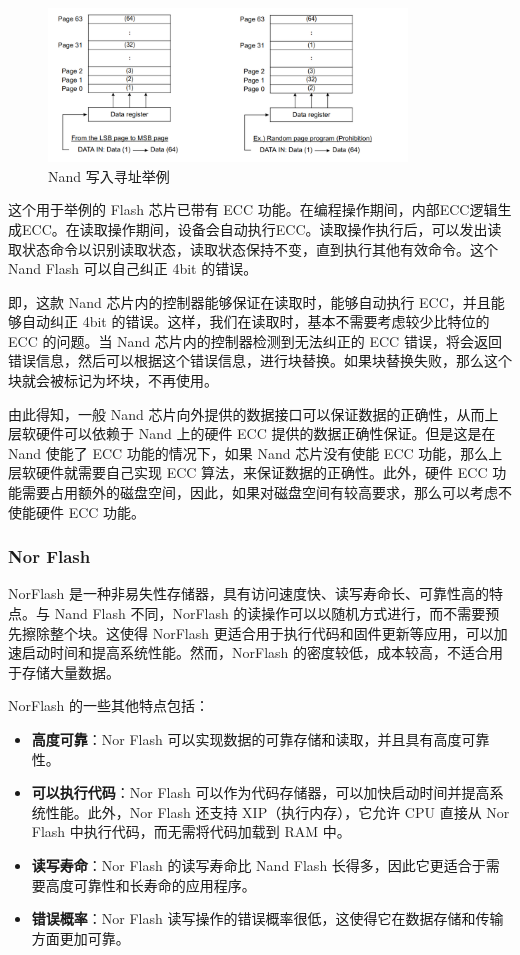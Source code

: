 \begin{figure}[htbp]
  \centering
  \includegraphics[width=0.85\textwidth]{fig/nand-write-addr.png}
  \caption{Nand 写入寻址举例}
  \label{nand-write-addr}
\end{figure}

这个用于举例的 Flash 芯片已带有 ECC 功能。在编程操作期间，内部ECC逻辑生成ECC。在读取操作期间，设备会自动执行ECC。读取操作执行后，可以发出读取状态命令以识别读取状态，读取状态保持不变，直到执行其他有效命令。这个 Nand Flash 可以自己纠正 4bit 的错误。

即，这款 Nand 芯片内的控制器能够保证在读取时，能够自动执行 ECC，并且能够自动纠正 4bit 的错误。这样，我们在读取时，基本不需要考虑较少比特位的 ECC 的问题。当 Nand 芯片内的控制器检测到无法纠正的 ECC 错误，将会返回错误信息，然后可以根据这个错误信息，进行块替换。如果块替换失败，那么这个块就会被标记为坏块，不再使用。

由此得知，一般 Nand 芯片向外提供的数据接口可以保证数据的正确性，从而上层软硬件可以依赖于 Nand 上的硬件 ECC 提供的数据正确性保证。但是这是在 Nand 使能了 ECC 功能的情况下，如果 Nand 芯片没有使能 ECC 功能，那么上层软硬件就需要自己实现 ECC 算法，来保证数据的正确性。此外，硬件 ECC 功能需要占用额外的磁盘空间，因此，如果对磁盘空间有较高要求，那么可以考虑不使能硬件 ECC 功能。

\subsubsection{Nor Flash}

NorFlash 是一种非易失性存储器，具有访问速度快、读写寿命长、可靠性高的特点。与 Nand Flash 不同，NorFlash 的读操作可以以随机方式进行，而不需要预先擦除整个块。这使得 NorFlash 更适合用于执行代码和固件更新等应用，可以加速启动时间和提高系统性能。然而，NorFlash 的密度较低，成本较高，不适合用于存储大量数据。

NorFlash 的一些其他特点包括：

\begin{itemize}
  \item {\bf{高度可靠}}：Nor Flash 可以实现数据的可靠存储和读取，并且具有高度可靠性。
  \item {\bf{可以执行代码}}：Nor Flash 可以作为代码存储器，可以加快启动时间并提高系统性能。此外，Nor Flash 还支持 XIP（执行内存），它允许 CPU 直接从 Nor Flash 中执行代码，而无需将代码加载到 RAM 中。
  \item {\bf{读写寿命}}：Nor Flash 的读写寿命比 Nand Flash 长得多，因此它更适合于需要高度可靠性和长寿命的应用程序。
  \item {\bf{错误概率}}：Nor Flash 读写操作的错误概率很低，这使得它在数据存储和传输方面更加可靠。
\end{itemize}